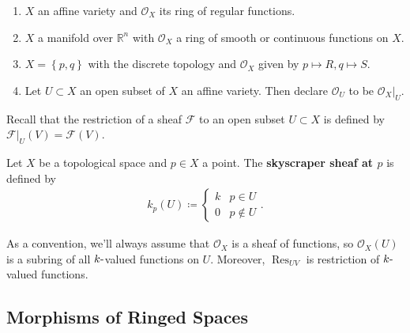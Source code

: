 \begin{example}

\envlist

\begin{enumerate}
\def\labelenumi{\arabic{enumi}.}
\item
  \(X\) an affine variety and \({\mathcal{O}}_X\) its ring of regular
  functions.
\item
  \(X\) a manifold over \({\mathbb{R}}^n\) with \({\mathcal{O}}_X\) a
  ring of smooth or continuous functions on \(X\).
\item
  \(X = \left\{{p, q}\right\}\) with the discrete topology and
  \({\mathcal{O}}_X\) given by \(p\mapsto R, q\mapsto S\).
\item
  Let \(U\subset X\) an open subset of \(X\) an affine variety. Then
  declare \({\mathcal{O}}_U\) to be
  \({ \left.{{{\mathcal{O}}_X}} \right|_{{U}} }\).
\end{enumerate}

\end{example}

Recall that the restriction of a sheaf \(\mathcal{F}\) to an open subset
\(U\subset X\) is defined by
\({ \left.{{\mathcal{F}}} \right|_{{U}} }(V) = \mathcal{F}(V)\).

\begin{example}

Let \(X\) be a topological space and \(p\in X\) a point. The
\textbf{skyscraper sheaf at \(p\)} is defined by
\begin{align*}  
k_p(U) \coloneqq
\begin{cases}
k & p\in U \\
0 & p\not\in U
\end{cases}
.\end{align*}

\end{example}

\begin{remark}

As a convention, we'll always assume that \({\mathcal{O}}_X\) is a sheaf
of functions, so \({\mathcal{O}}_X(U)\) is a subring of all
\(k{\hbox{-}}\)valued functions on \(U\). Moreover,
\(\operatorname{Res}_{UV}\) is restriction of \(k{\hbox{-}}\)valued
functions.

\end{remark}

\hypertarget{morphisms-of-ringed-spaces}{%
\subsection{Morphisms of Ringed
Spaces}\label{morphisms-of-ringed-spaces}}

